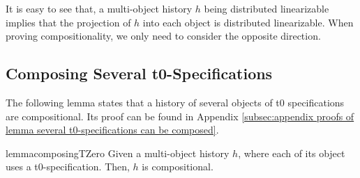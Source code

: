 It is easy to see that, a multi-object history $h$ being distributed linearizable implies that the projection of $h$ into each object is distributed linearizable. When proving compositionality, we only need to consider the opposite direction. 




\subsection{Composing Several t0-Specifications}
\label{lemma:several t0-specifications can be composed}

The following lemma states that a history of several objects of t0 specifications are compositional. Its proof can be found in Appendix \ref{subsec:appendix proofs of lemma several t0-specifications can be composed}.

\begin{restatable}{lemma}{composingTZero}
\label{lemma:several t0-specifications can be composed}
Given a multi-object history $h$, where each of its object uses a t0-specification. Then, $h$ is compositional. 
\end{restatable}







